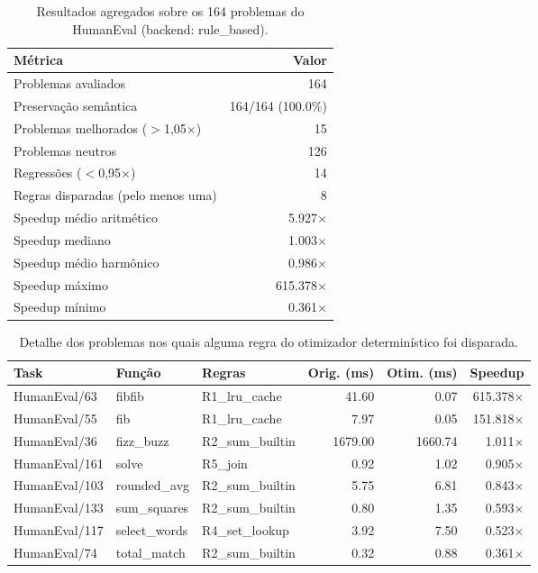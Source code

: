 \begin{table}[htbp]
\caption{Resultados agregados sobre os 164 problemas do HumanEval (backend: rule\_based).}
\label{tab:agregado}
\centering
\begin{tabular}{lr}
\hline
\textbf{Métrica} & \textbf{Valor} \\
\hline
Problemas avaliados & 164 \\
Preservação semântica & 164/164 (100.0\%) \\
Problemas melhorados ($>$1{,}05$\times$) & 15 \\
Problemas neutros & 126 \\
Regressões ($<$0{,}95$\times$) & 14 \\
Regras disparadas (pelo menos uma) & 8 \\
\hline
Speedup médio aritmético & 5.927$\times$ \\
Speedup mediano & 1.003$\times$ \\
Speedup médio harmônico & 0.986$\times$ \\
Speedup máximo & 615.378$\times$ \\
Speedup mínimo & 0.361$\times$ \\
\hline
\end{tabular}
\end{table}

\begin{table}[htbp]
\caption{Detalhe dos problemas nos quais alguma regra do otimizador determinístico foi disparada.}
\label{tab:detalhe}
\centering
\footnotesize
\begin{tabular}{lllrrr}
\hline
\textbf{Task} & \textbf{Função} & \textbf{Regras} & \textbf{Orig. (ms)} & \textbf{Otim. (ms)} & \textbf{Speedup} \\
\hline
HumanEval/63 & fibfib & R1\_lru\_cache & 41.60 & 0.07 & 615.378$\times$ \\
HumanEval/55 & fib & R1\_lru\_cache & 7.97 & 0.05 & 151.818$\times$ \\
HumanEval/36 & fizz\_buzz & R2\_sum\_builtin & 1679.00 & 1660.74 & 1.011$\times$ \\
HumanEval/161 & solve & R5\_join & 0.92 & 1.02 & 0.905$\times$ \\
HumanEval/103 & rounded\_avg & R2\_sum\_builtin & 5.75 & 6.81 & 0.843$\times$ \\
HumanEval/133 & sum\_squares & R2\_sum\_builtin & 0.80 & 1.35 & 0.593$\times$ \\
HumanEval/117 & select\_words & R4\_set\_lookup & 3.92 & 7.50 & 0.523$\times$ \\
HumanEval/74 & total\_match & R2\_sum\_builtin & 0.32 & 0.88 & 0.361$\times$ \\
\hline
\end{tabular}
\end{table}

